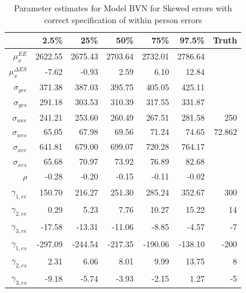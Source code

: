 \documentclass[11pt]{article}\usepackage[]{graphicx}\usepackage[]{color}
\begin{document}
\begin{table}[ht]
\centering
\begin{tabular}{rrrrrr|r}
  \hline
 & 2.5\% & 25\% & 50\% & 75\% & 97.5\% & Truth\\
  \hline
$\mu_x^{EE}$ & 2622.55 & 2675.43 & 2703.64 & 2732.01 & 2786.64 \\ 
  $\mu_x^{\Delta ES}$ & -7.62 & -0.93 & 2.59 & 6.10 & 12.84 \\ 
  $\sigma_{yee}$ & 371.38 & 387.03 & 395.75 & 405.05 & 425.11 \\ 
  $\sigma_{yes}$ & 291.18 & 303.53 & 310.39 & 317.55 & 331.87 \\ 
  $\sigma_{wee}$ & 241.21 & 253.60 & 260.49 & 267.51 & 281.58 & 250 \\ 
  $\sigma_{wes}$ & 65.05 & 67.98 & 69.56 & 71.24 & 74.65 & 72.862\\ 
  $\sigma_{xee}$ & 641.81 & 679.00 & 699.07 & 720.28 & 764.17 \\ 
  $\sigma_{xes}$ & 65.68 & 70.97 & 73.92 & 76.89 & 82.68 \\ 
  $\rho$ & -0.28 & -0.20 & -0.15 & -0.11 & -0.02 \\ 
  $\gamma_{1,ee}$ & 150.70 & 216.27 & 251.30 & 285.24 & 352.67 & 300 \\ 
  $\gamma_{2,ee}$ & 0.29 & 5.23 & 7.76 & 10.27 & 15.22 & 14\\ 
  $\gamma_{3,ee}$ & -17.58 & -13.31 & -11.06 & -8.85 & -4.57 & -7 \\ 
  $\gamma_{1,es}$ & -297.09 & -244.54 & -217.35 & -190.06 & -138.10 & -200 \\ 
  $\gamma_{2,es}$ & 2.31 & 6.06 & 8.01 & 9.99 & 13.75 & 8\\ 
  $\gamma_{3,es}$ & -9.18 & -5.74 & -3.93 & -2.15 & 1.27 & -5 \\ 
   \hline
\end{tabular}
\caption{Parameter estimates for Model BVN for Skewed errors with correct specification of within person errors}
\label{mbvnswpestimates}
\end{table}
\end{document}
